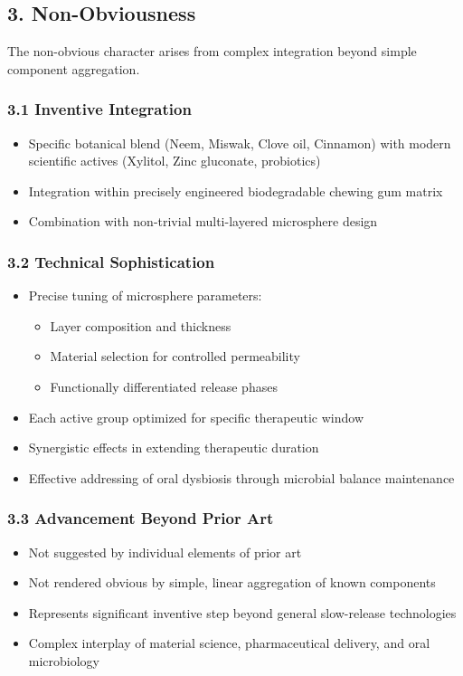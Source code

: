 \documentclass[12pt]{article}
\begin{document}
\subsection*{3. Non-Obviousness}
The non-obvious character arises from complex integration beyond simple component aggregation.

\subsubsection*{3.1 Inventive Integration}
\begin{itemize}
    \item Specific botanical blend (Neem, Miswak, Clove oil, Cinnamon) with modern scientific actives (Xylitol, Zinc gluconate, probiotics)
    \item Integration within precisely engineered biodegradable chewing gum matrix
    \item Combination with non-trivial multi-layered microsphere design
\end{itemize}

\subsubsection*{3.2 Technical Sophistication}
\begin{itemize}
    \item Precise tuning of microsphere parameters:
    \begin{itemize}
        \item Layer composition and thickness
        \item Material selection for controlled permeability
        \item Functionally differentiated release phases
    \end{itemize}
    \item Each active group optimized for specific therapeutic window
    \item Synergistic effects in extending therapeutic duration
    \item Effective addressing of oral dysbiosis through microbial balance maintenance
\end{itemize}

\subsubsection*{3.3 Advancement Beyond Prior Art}
\begin{itemize}
    \item Not suggested by individual elements of prior art
    \item Not rendered obvious by simple, linear aggregation of known components
    \item Represents significant inventive step beyond general slow-release technologies
    \item Complex interplay of material science, pharmaceutical delivery, and oral microbiology
\end{itemize}
\end{document}
